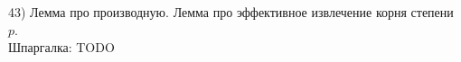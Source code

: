 43) Лемма про производную. Лемма про эффективное извлечение корня степени $p$.\\

Шпаргалка: TODO\\
